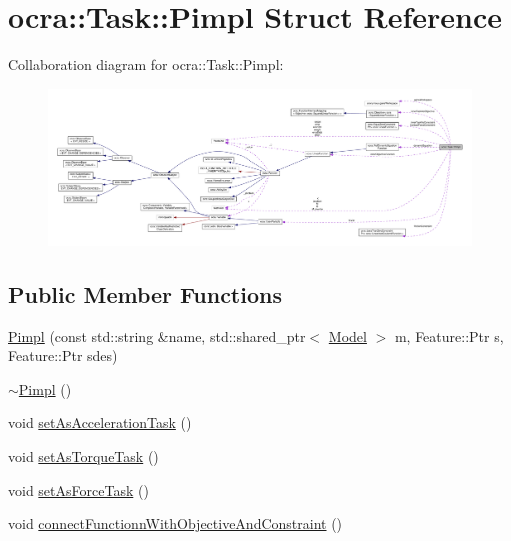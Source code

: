 \hypertarget{structocra_1_1Task_1_1Pimpl}{}\section{ocra\+:\+:Task\+:\+:Pimpl Struct Reference}
\label{structocra_1_1Task_1_1Pimpl}


Collaboration diagram for ocra\+:\+:Task\+:\+:Pimpl\+:
\nopagebreak
\begin{figure}[H]
\begin{center}
\leavevmode
\includegraphics[width=350pt]{df/da6/structocra_1_1Task_1_1Pimpl__coll__graph}
\end{center}
\end{figure}
\subsection*{Public Member Functions}
\begin{DoxyCompactItemize}
\item 
\hyperlink{structocra_1_1Task_1_1Pimpl_a3d7faa7e6fa107d07e079823df57b07e}{Pimpl} (const std\+::string \&name, std\+::shared\+\_\+ptr$<$ \hyperlink{classocra_1_1Model}{Model} $>$ m, Feature\+::\+Ptr s, Feature\+::\+Ptr sdes)
\item 
\hyperlink{structocra_1_1Task_1_1Pimpl_ae00df5386f25d40f820ef4bc1296ea4a}{$\sim$\+Pimpl} ()
\item 
void \hyperlink{structocra_1_1Task_1_1Pimpl_a1b06484c1ce60c68a20df0369bdb8221}{set\+As\+Acceleration\+Task} ()
\item 
void \hyperlink{structocra_1_1Task_1_1Pimpl_ab5bfb5126aa62de5e77c49c65711f0c2}{set\+As\+Torque\+Task} ()
\item 
void \hyperlink{structocra_1_1Task_1_1Pimpl_a6591dc9a28cc7cc30473559600bf5cb6}{set\+As\+Force\+Task} ()
\item 
void \hyperlink{structocra_1_1Task_1_1Pimpl_aabf390e84dff086a53ea876fad5755c5}{connect\+Functionn\+With\+Objective\+And\+Constraint} ()
\end{DoxyCompactItemize}
